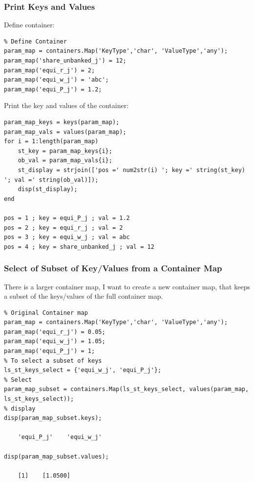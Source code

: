 \documentclass[
]{book}
\begin{document}
\hypertarget{print-keys-and-values}{%
\subsubsection{Print Keys and Values}\label{print-keys-and-values}}

Define container:

\begin{verbatim}
% Define Container
param_map = containers.Map('KeyType','char', 'ValueType','any');
param_map('share_unbanked_j') = 12;
param_map('equi_r_j') = 2;
param_map('equi_w_j') = 'abc';
param_map('equi_P_j') = 1.2;
\end{verbatim}

Print the key and values of the container:

\begin{verbatim}
param_map_keys = keys(param_map);
param_map_vals = values(param_map);
for i = 1:length(param_map)
    st_key = param_map_keys{i};
    ob_val = param_map_vals{i};
    st_display = strjoin(['pos =' num2str(i) '; key =' string(st_key) '; val =' string(ob_val)]);
    disp(st_display);
end

pos = 1 ; key = equi_P_j ; val = 1.2
pos = 2 ; key = equi_r_j ; val = 2
pos = 3 ; key = equi_w_j ; val = abc
pos = 4 ; key = share_unbanked_j ; val = 12
\end{verbatim}

\hypertarget{select-of-subset-of-keyvalues-from-a-container-map}{%
\subsubsection{Select of Subset of Key/Values from a Container Map}\label{select-of-subset-of-keyvalues-from-a-container-map}}

There is a larger container map, I want to create a new container map,
that keeps a subset of the keys/values of the full container map.

\begin{verbatim}
% Original Container map
param_map = containers.Map('KeyType','char', 'ValueType','any');
param_map('equi_r_j') = 0.05;
param_map('equi_w_j') = 1.05;
param_map('equi_P_j') = 1;
% To select a subset of keys
ls_st_keys_select = {'equi_w_j', 'equi_P_j'};
% Select
param_map_subset = containers.Map(ls_st_keys_select, values(param_map, ls_st_keys_select));
% display
disp(param_map_subset.keys);

    'equi_P_j'    'equi_w_j'

disp(param_map_subset.values);

    [1]    [1.0500]
\end{verbatim}
\end{document}
